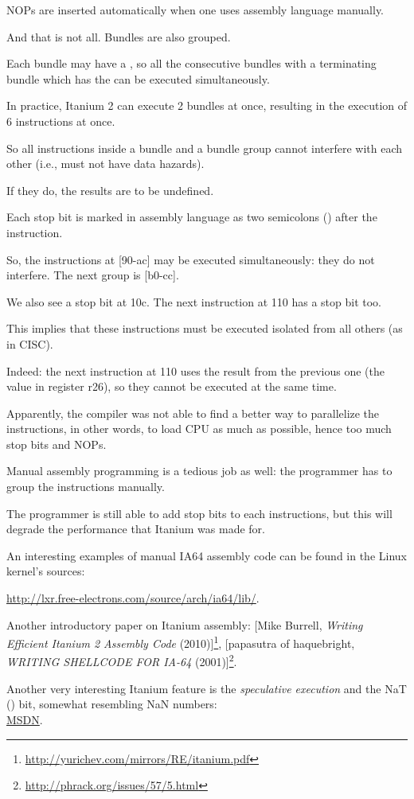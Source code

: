 \ac{NOP}s are inserted automatically when one uses assembly language manually.

And that is not all. Bundles are also grouped.

Each bundle may have a ,
so all the consecutive bundles with a terminating bundle which has the  
can be executed simultaneously.

In practice, Itanium 2 can execute 2 bundles at once, resulting in the execution of 6 instructions at once.

So all instructions inside a bundle and a bundle group cannot interfere with each other 
(i.e., must not have data hazards).

If they do, the results are to be undefined.

Each stop bit is marked in assembly language as two semicolons (\TT{;;}) after the instruction.

So, the instructions at [90-ac] may be executed simultaneously:
they do not interfere. The next group is [b0-cc].

We also see a stop bit at 10c.
The next instruction at 110 has a stop bit too.

This implies that these instructions must be executed isolated from all others (as in \ac{CISC}).

Indeed: the next instruction at 110 uses the result from the previous one (the value in register r26),
so they cannot be executed at the same time.

Apparently, the compiler was not able to find a better way to parallelize the instructions,
in other words, to load \ac{CPU} as much as possible, hence too much stop bits and \ac{NOP}s.

Manual assembly programming is a tedious job as well: the programmer has to group the instructions manually.

The programmer is still able to add stop bits to each instructions, but this will degrade
the performance that Itanium was made for.

An interesting examples of manual \ac{IA64} assembly code can be found in the Linux kernel's sources:

\url{http://lxr.free-electrons.com/source/arch/ia64/lib/}.

Another introductory paper on Itanium assembly:
[Mike Burrell, \emph{Writing Efficient Itanium 2 Assembly Code} (2010)]\footnote{\AlsoAvailableAs \url{http://yurichev.com/mirrors/RE/itanium.pdf}},
[papasutra of haquebright, \emph{WRITING SHELLCODE FOR IA-64} (2001)]\footnote{\AlsoAvailableAs \url{http://phrack.org/issues/57/5.html}}.

Another very interesting Itanium feature is the \emph{speculative execution} and the NaT () bit,
somewhat resembling \gls{NaN} numbers: \\
\href{http://blogs.msdn.com/b/oldnewthing/archive/2004/01/19/60162.aspx}{MSDN}.

